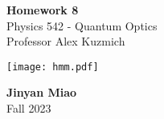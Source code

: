\documentclass[11pt, oneside]{book}
\theoremstyle{break}
\theoremstyle{break}
\begin{document}
	\begin{titlepage}
		\begin{center}
			\vspace*{0.5cm}
			\Huge \color{red}
				\textbf{Homework 8}\\
			\vspace{0.5cm}			
			\Large \color{black}
			Physics 542 - Quantum Optics\\
			Professor Alex Kuzmich
			\vspace{1.5cm}

			\texttt{[image: hmm.pdf]}
			
			
			\vspace{2cm}
			\LARGE
				\textbf{Jinyan Miao}\\
				\hfill\break
				\LARGE Fall 2023\\
			\vspace{1cm}

		\vspace*{\fill}
		\end{center}			
	\end{titlepage}
\end{document}

